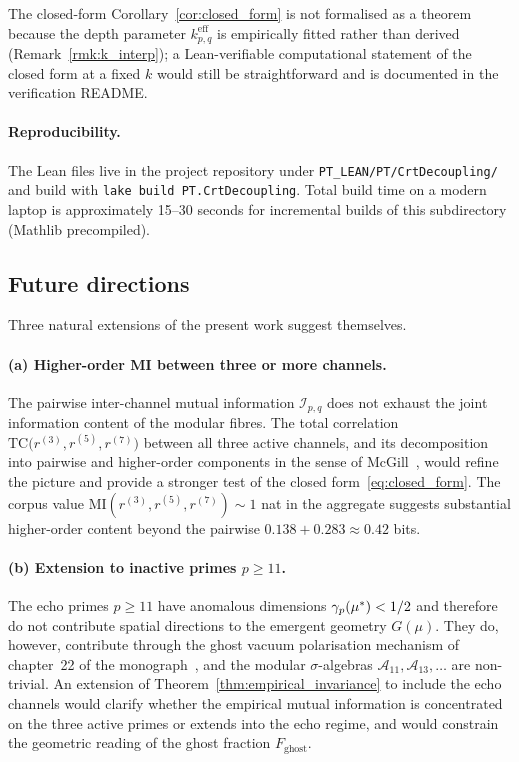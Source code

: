 The closed-form Corollary~\ref{cor:closed_form} is not formalised
as a theorem because the depth parameter $k_{p,q}^{\mathrm{eff}}$
is empirically fitted rather than derived
(Remark~\ref{rmk:k_interp}); a Lean-verifiable computational
statement of the closed form at a fixed $k$ would still be
straightforward and is documented in the verification README.

\paragraph{Reproducibility.}
The Lean files live in the project repository under
\texttt{PT\_LEAN/PT/CrtDecoupling/} and build with
\texttt{lake build PT.CrtDecoupling}. Total build time on a
modern laptop is approximately 15--30 seconds for incremental
builds of this subdirectory (Mathlib precompiled).

\subsection{Future directions}
\label{ssec:future}

Three natural extensions of the present work suggest themselves.

\paragraph{(a) Higher-order MI between three or more channels.}
The pairwise inter-channel mutual information
$\mathcal{I}_{p,q}$ does not exhaust the joint information content
of the modular fibres. The total correlation
$\mathrm{TC}\bigl(r^{(3)}, r^{(5)}, r^{(7)}\bigr)$ between all
three active channels, and its decomposition into pairwise and
higher-order components in the sense of
McGill~\cite[\S~7.4]{CoverThomas2006}, would refine the picture and
provide a stronger test of the closed
form~\eqref{eq:closed_form}. The corpus value
$\mathrm{MI}(r^{(3)}, r^{(5)}, r^{(7)}) \sim 1$ nat in the
aggregate suggests substantial higher-order content beyond the
pairwise $0.138 + 0.283 \approx 0.42$ bits.

\paragraph{(b) Extension to inactive primes $p \geq 11$.}
The echo primes $p \geq 11$ have anomalous dimensions
$\gamma_{p}({\mu^{*}}) < 1/2$ and therefore do not contribute spatial
directions to the emergent geometry $G(\mu)$. They do, however,
contribute through the ghost vacuum polarisation mechanism of
chapter~22 of the monograph~\cite{PT_Monograph}, and the modular
$\sigma$-algebras $\mathcal{A}_{11}, \mathcal{A}_{13}, \ldots$
are non-trivial. An extension of
Theorem~\ref{thm:empirical_invariance} to include the echo
channels would clarify whether the empirical mutual information
is concentrated on the three active primes or extends into the
echo regime, and would constrain the geometric reading of the
ghost fraction $F_{\mathrm{ghost}}$.

